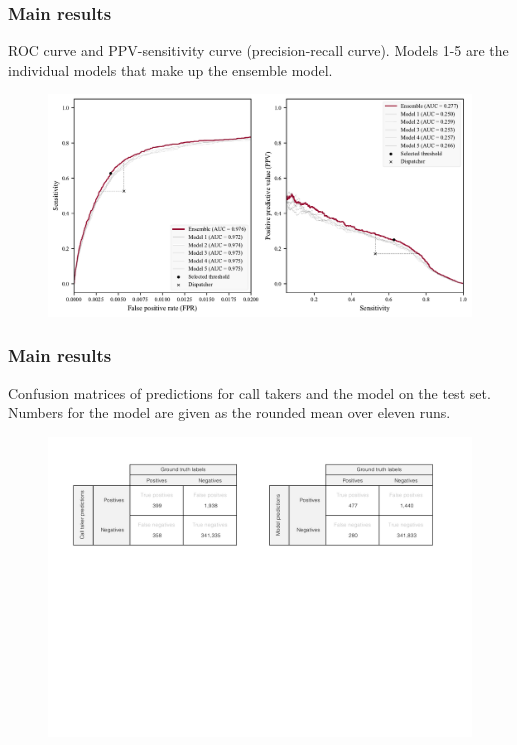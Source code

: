 \begin{frame}
    \frametitle{Main results}
    ROC curve and PPV-sensitivity curve (precision-recall curve). Models 1-5 are the individual models that make up the ensemble model.
    \begin{figure}
        \centering
        \includegraphics[width=0.65\paperwidth]{../graphics/paper_retrospective/figure1.pdf}
    \end{figure}
\end{frame}


\begin{frame}
    \frametitle{Main results}
    Confusion matrices of predictions for call takers and the model on the test set. Numbers for the model are given as the rounded mean over eleven runs.
    \begin{figure}
        \centering
        \includegraphics[width=0.85\paperwidth]{../graphics/paper_retrospective/figure2.pdf}
    \end{figure}
\end{frame}


